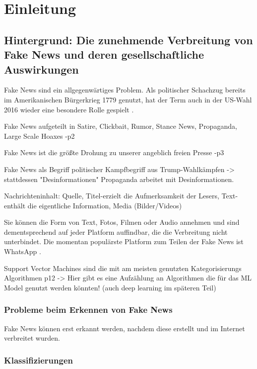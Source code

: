 \chapter{Einleitung}
\label{chap:einleitung}

\section{Hintergrund: Die zunehmende Verbreitung von Fake News und deren gesellschaftliche Auswirkungen}
\label{sec:hintergrund}

Fake News sind ein allgegenwärtiges Problem. Als politischer Schachzug bereits im Amerikanischen Bürgerkrieg 1779 genutzt, 
hat der Term auch in der US-Wahl 2016 wieder eine besondere Rolle gespielt \cite{Sharma:2024}.

Fake News aufgeteilt in Satire, Clickbait, Rumor, Stance News, Propaganda, Large Scale Hoaxes \cite{Sharma:2024}-p2

Fake News ist die größte Drohung zu unserer angeblich freien Presse \cite{Sharma:2024}-p3

Fake News als Begriff politischer Kampfbegriff aus Trump-Wahlkämpfen -> stattdessen "Desinformationen" \cite{buerker2022fakenews}
Propaganda arbeitet mit Desinformationen. \cite{buerker2022fakenews}

Nachrichteninhalt: Quelle, Titel-erzielt die Aufmerksamkeit der Lesers, Text-enthält die eigentliche Information, Media (Bilder/Videos)

Sie können die Form von Text, Fotos, Filmen oder Audio annehmen und sind dementsprechend auf jeder Platform auffindbar, 
die die Verbreitung nicht unterbindet. Die momentan populärste Platform zum Teilen der Fake News ist WhatsApp \cite{Ashish2024}.

Support Vector Machines sind die mit am meisten genutzten Kategorisierungs Algorithmen \cite{Sharma:2024}p12
-> Hier gibt es eine Aufzählung an Algorithmen die für das ML Model genutzt werden könnten! (auch deep learning im späteren Teil)

\subsection{Probleme beim Erkennen von Fake News}

Fake News können erst erkannt werden, nachdem diese erstellt und im Internet verbreitet wurden. \cite{Sharma:2024}

\subsection{Klassifizierungen}

